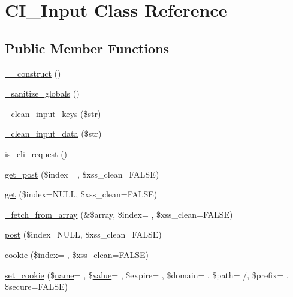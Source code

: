 \hypertarget{class_c_i___input}{}\section{C\+I\+\_\+\+Input Class Reference}
\label{class_c_i___input}
\subsection*{Public Member Functions}
\begin{DoxyCompactItemize}
\item 
\hyperlink{class_c_i___input_a095c5d389db211932136b53f25f39685}{\+\_\+\+\_\+construct} ()
\item 
\hyperlink{class_c_i___input_aadbb0e5cbf9b5783c872cb402ea6a2fa}{\+\_\+sanitize\+\_\+globals} ()
\item 
\hyperlink{class_c_i___input_af42e370cfe61ee5a34b72cf37b919210}{\+\_\+clean\+\_\+input\+\_\+keys} (\$str)
\item 
\hyperlink{class_c_i___input_a9c594152e7b189a290f6425df8712b73}{\+\_\+clean\+\_\+input\+\_\+data} (\$str)
\item 
\hyperlink{class_c_i___input_a70c1e8a081ef955c1a52164634d4f66e}{is\+\_\+cli\+\_\+request} ()
\item 
\hyperlink{class_c_i___input_aec54f245bc5c3215ba81a594ed858b2f}{get\+\_\+post} (\$index= \textquotesingle{}\textquotesingle{}, \$xss\+\_\+clean=F\+A\+L\+SE)
\item 
\hyperlink{class_c_i___input_a7f3fe35f15454cbad4f12fd8a0e195e1}{get} (\$index=N\+U\+LL, \$xss\+\_\+clean=F\+A\+L\+SE)
\item 
\hyperlink{class_c_i___input_a206046338a68072d20b5bde395c42cd7}{\+\_\+fetch\+\_\+from\+\_\+array} (\&\$array, \$index= \textquotesingle{}\textquotesingle{}, \$xss\+\_\+clean=F\+A\+L\+SE)
\item 
\hyperlink{class_c_i___input_a50ac0e340a9da4d85cc976e78d99a7c0}{post} (\$index=N\+U\+LL, \$xss\+\_\+clean=F\+A\+L\+SE)
\item 
\hyperlink{class_c_i___input_a60e581edbf6507bf0702fd5212ac79a4}{cookie} (\$index= \textquotesingle{}\textquotesingle{}, \$xss\+\_\+clean=F\+A\+L\+SE)
\item 
\hyperlink{class_c_i___input_aae6a307dce00b4d06a29c6f0be9e4b59}{set\+\_\+cookie} (\$\hyperlink{user_8php_a765af5e9671743530143a6d3670fd9a6}{name}= \textquotesingle{}\textquotesingle{}, \$\hyperlink{fullpage_2plugin_8min_8js_ac56c57897e10f699d124e0103921aa20}{value}= \textquotesingle{}\textquotesingle{}, \$expire= \textquotesingle{}\textquotesingle{}, \$domain= \textquotesingle{}\textquotesingle{}, \$path= \textquotesingle{}/\textquotesingle{}, \$prefix= \textquotesingle{}\textquotesingle{}, \$secure=F\+A\+L\+SE)

\end{DoxyCompactItemize}
